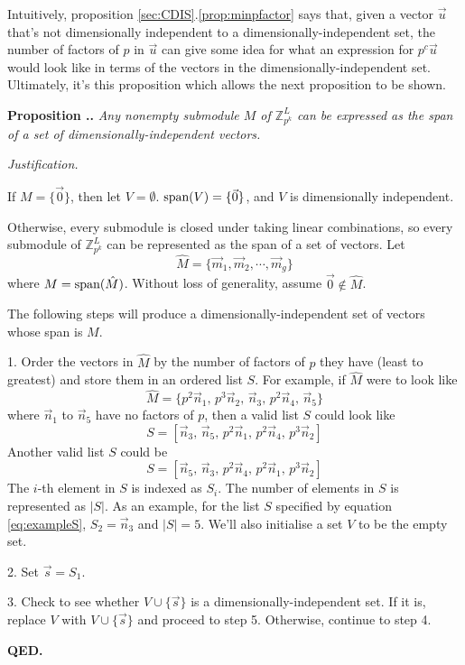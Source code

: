 \documentclass[a4paper, 12pt, reqno]{amsart}
\newcommand\vecspan[1]{\textup{span}(#1)}
\newcounter{propcounter}[section]
\newenvironment{proposition}[1]
{
	\refstepcounter{propcounter}
	\textbf{Proposition \thesection.\thepropcounter.} \emph{#1}
	
	\emph{Justification.}
}
{
	\textbf{QED.} \\
}
\begin{document}
		Intuitively, proposition \ref{sec:CDIS}.\ref{prop:minpfactor} says that, given a vector $\vec{u}$ that's not dimensionally independent to a 
		dimensionally-independent set, the number of factors of $p$ in $\vec{u}$ can give some idea for what an expression for $p^c\vec{u}$ would look like in terms of the 
		vectors in the dimensionally-independent set. Ultimately, it's this proposition which allows the next proposition to be shown.
		
		\begin{proposition}{Any nonempty submodule $M$ of $\mathds{Z}_{p^k}^L$ can be expressed as the span of a set of dimensionally-independent vectors.}
			\label{prop:DIsubmodule}
			If $M = \{\vec{0}\}$, then let $V = \emptyset$. $\vecspan{V} = \{\vec{0}\}$, and $V$ is dimensionally independent.
			
			Otherwise, every submodule is closed under taking linear combinations, so every submodule of $\mathds{Z}_{p^k}^L$ can be represented as the span of a set of 
			vectors. Let 
			\[
				\hat{M} = \{\vec{m}_1, \vec{m}_2, \cdots, \vec{m}_g\}
			\]
			where $M = \vecspan{\hat{M}}$. Without loss of generality, assume $\vec{0} \not\in \hat{M}$.
			
			The following steps will produce a dimensionally-independent set of vectors whose span is $M$.
			
			1. Order the vectors in $\hat{M}$ by the number of factors of $p$ they have (least to greatest) and store them in an ordered list $S$. For example, if $\hat{M}$ 
			were to look like 
			\[
				\hat{M} = \{p^2\vec{n}_1,\, p^3\vec{n}_2,\, \vec{n}_3,\, p^2\vec{n}_4,\, \vec{n}_5\}
			\]
			where $\vec{n}_1$ to $\vec{n}_5$ have no factors of $p$, then a valid list $S$ could look like
			\[
				S = [\vec{n}_3,\, \vec{n}_5,\, p^2\vec{n}_1,\, p^2\vec{n}_4,\, p^3\vec{n}_2]
			\]
			Another valid list $S$ could be
			\begin{equation}
				\label{eq:exampleS}
				S = [\vec{n}_5,\, \vec{n}_3,\, p^2\vec{n}_4,\, p^2\vec{n}_1,\, p^3\vec{n}_2]
			\end{equation}
			The $i$-th element in $S$ is indexed as $S_i$. The number of elements in $S$ is represented as $|S|$. As an example, for the list $S$ specified by equation 
			\ref{eq:exampleS}, $S_2 = \vec{n}_3$ and $|S| = 5$. We'll also initialise a set $V$ to be the empty set.
			
			2. Set $\vec{s} = S_1$.
			
			3. Check to see whether $V \cup \{\vec{s}\}$ is a dimensionally-independent set. If it is, replace $V$ with $V \cup \{\vec{s}\}$ and proceed to step 5.
			Otherwise, continue to step 4.
			

\end{proposition}
\end{document}
